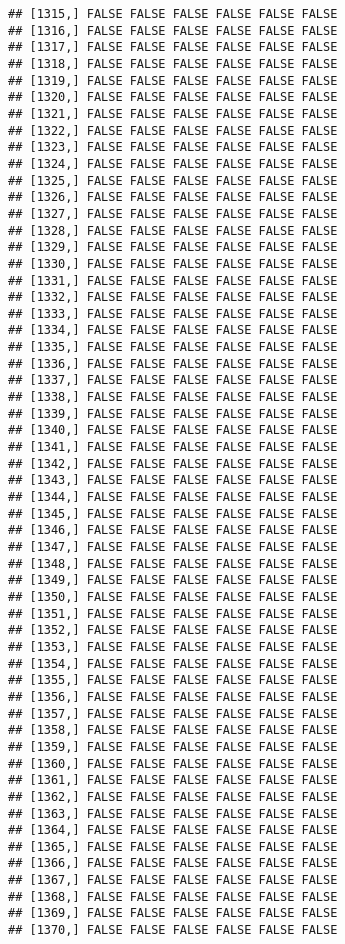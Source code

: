 \documentclass[
]{article}
\begin{document}
\begin{verbatim}
## [1315,] FALSE FALSE FALSE FALSE FALSE FALSE
## [1316,] FALSE FALSE FALSE FALSE FALSE FALSE
## [1317,] FALSE FALSE FALSE FALSE FALSE FALSE
## [1318,] FALSE FALSE FALSE FALSE FALSE FALSE
## [1319,] FALSE FALSE FALSE FALSE FALSE FALSE
## [1320,] FALSE FALSE FALSE FALSE FALSE FALSE
## [1321,] FALSE FALSE FALSE FALSE FALSE FALSE
## [1322,] FALSE FALSE FALSE FALSE FALSE FALSE
## [1323,] FALSE FALSE FALSE FALSE FALSE FALSE
## [1324,] FALSE FALSE FALSE FALSE FALSE FALSE
## [1325,] FALSE FALSE FALSE FALSE FALSE FALSE
## [1326,] FALSE FALSE FALSE FALSE FALSE FALSE
## [1327,] FALSE FALSE FALSE FALSE FALSE FALSE
## [1328,] FALSE FALSE FALSE FALSE FALSE FALSE
## [1329,] FALSE FALSE FALSE FALSE FALSE FALSE
## [1330,] FALSE FALSE FALSE FALSE FALSE FALSE
## [1331,] FALSE FALSE FALSE FALSE FALSE FALSE
## [1332,] FALSE FALSE FALSE FALSE FALSE FALSE
## [1333,] FALSE FALSE FALSE FALSE FALSE FALSE
## [1334,] FALSE FALSE FALSE FALSE FALSE FALSE
## [1335,] FALSE FALSE FALSE FALSE FALSE FALSE
## [1336,] FALSE FALSE FALSE FALSE FALSE FALSE
## [1337,] FALSE FALSE FALSE FALSE FALSE FALSE
## [1338,] FALSE FALSE FALSE FALSE FALSE FALSE
## [1339,] FALSE FALSE FALSE FALSE FALSE FALSE
## [1340,] FALSE FALSE FALSE FALSE FALSE FALSE
## [1341,] FALSE FALSE FALSE FALSE FALSE FALSE
## [1342,] FALSE FALSE FALSE FALSE FALSE FALSE
## [1343,] FALSE FALSE FALSE FALSE FALSE FALSE
## [1344,] FALSE FALSE FALSE FALSE FALSE FALSE
## [1345,] FALSE FALSE FALSE FALSE FALSE FALSE
## [1346,] FALSE FALSE FALSE FALSE FALSE FALSE
## [1347,] FALSE FALSE FALSE FALSE FALSE FALSE
## [1348,] FALSE FALSE FALSE FALSE FALSE FALSE
## [1349,] FALSE FALSE FALSE FALSE FALSE FALSE
## [1350,] FALSE FALSE FALSE FALSE FALSE FALSE
## [1351,] FALSE FALSE FALSE FALSE FALSE FALSE
## [1352,] FALSE FALSE FALSE FALSE FALSE FALSE
## [1353,] FALSE FALSE FALSE FALSE FALSE FALSE
## [1354,] FALSE FALSE FALSE FALSE FALSE FALSE
## [1355,] FALSE FALSE FALSE FALSE FALSE FALSE
## [1356,] FALSE FALSE FALSE FALSE FALSE FALSE
## [1357,] FALSE FALSE FALSE FALSE FALSE FALSE
## [1358,] FALSE FALSE FALSE FALSE FALSE FALSE
## [1359,] FALSE FALSE FALSE FALSE FALSE FALSE
## [1360,] FALSE FALSE FALSE FALSE FALSE FALSE
## [1361,] FALSE FALSE FALSE FALSE FALSE FALSE
## [1362,] FALSE FALSE FALSE FALSE FALSE FALSE
## [1363,] FALSE FALSE FALSE FALSE FALSE FALSE
## [1364,] FALSE FALSE FALSE FALSE FALSE FALSE
## [1365,] FALSE FALSE FALSE FALSE FALSE FALSE
## [1366,] FALSE FALSE FALSE FALSE FALSE FALSE
## [1367,] FALSE FALSE FALSE FALSE FALSE FALSE
## [1368,] FALSE FALSE FALSE FALSE FALSE FALSE
## [1369,] FALSE FALSE FALSE FALSE FALSE FALSE
## [1370,] FALSE FALSE FALSE FALSE FALSE FALSE

\end{verbatim}
\end{document}
